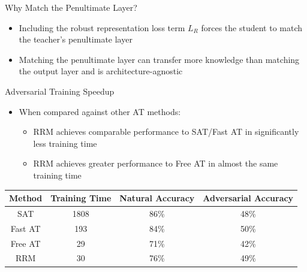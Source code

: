 \documentclass{beamer}
\begin{document}


\begin{frame}{Why Match the Penultimate Layer?}
	
	\begin{itemize}
		\item Including the robust representation loss term $L_R$ forces the student to match the teacher's penultimate layer
		\item Matching the penultimate layer can transfer more knowledge than matching the output layer and is architecture-agnostic
	\end{itemize}
	
\end{frame}



\begin{frame}{Adversarial Training Speedup}
	
	\begin{itemize}
		\item When compared against other AT methods:
		\begin{itemize}
			\item RRM achieves comparable performance to SAT/Fast AT in significantly less training time
			\item RRM achieves greater performance to Free AT in almost the same training time
		\end{itemize}
	\end{itemize}
	
	\begin{center}
		\begin{tabular}{ |c|c|c|c| } 
			\hline
			Method & Training Time & Natural Accuracy & Adversarial Accuracy \\
			\hline
			SAT & 1808 & 86\% & 48\% \\
			Fast AT & 193 & 84\% & 50\% \\
			Free AT & 29 & 71\% & 42\% \\
			RRM & 30 & 76\% & 49\% \\
			\hline
		\end{tabular}
	\end{center}
	
\end{frame}
\end{document}
